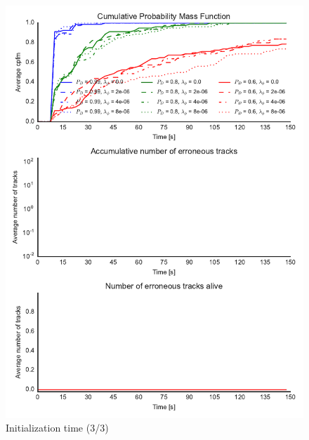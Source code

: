 \begin{figure}
\centering
\includegraphics{Figures/plots/Scenario0_Init-Time(3-3).pdf}
\caption{Initialization time (3/3)}\label{fig:init_time_3-3}
\end{figure}

